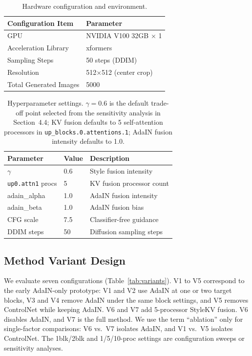 \documentclass[10pt,twocolumn]{article}
\begin{document}
\begin{table}[htbp]
  \centering
  \caption{Hardware configuration and environment.}
  \label{tab:hardware}
  \small
  \begin{tabular}{ll}
    \toprule
    Configuration Item & Parameter \\
    \midrule
    GPU & NVIDIA V100 32GB $\times$ 1 \\
    Acceleration Library & xformers \\
    Sampling Steps & 50 steps (DDIM) \\
    Resolution & 512$\times$512 (center crop) \\
    Total Generated Images & 5000 \\
    \bottomrule
  \end{tabular}
\end{table}

\begin{table}[htbp]
  \centering
  \caption{Hyperparameter settings. $\gamma=0.6$ is the default trade-off point selected from the sensitivity analysis in Section~4.4; KV fusion defaults to 5 self-attention processors in \texttt{up\_blocks.0.attentions.1}; AdaIN fusion intensity defaults to 1.0.}
  \label{tab:hyperparams}
  \small
  \begin{tabular}{lll}
    \toprule
    Parameter & Value & Description \\
    \midrule
    $\gamma$ & 0.6 & Style fusion intensity \\
    \texttt{up0.attn1} procs & 5 & KV fusion processor count \\
    adain\_alpha & 1.0 & AdaIN fusion intensity \\
    adain\_beta  & 1.0 & AdaIN fusion bias \\
    CFG scale & 7.5 & Classifier-free guidance \\
    DDIM steps & 50 & Diffusion sampling steps \\
    \bottomrule
  \end{tabular}
\end{table}

\subsection{Method Variant Design}

We evaluate seven configurations (Table~\ref{tab:variants}). V1 to V5 correspond to the early AdaIN-only prototype: V1 and V2 use AdaIN at one or two target blocks, V3 and V4 remove AdaIN under the same block settings, and V5 removes ControlNet while keeping AdaIN. V6 and V7 add 5-processor StyleKV fusion. V6 disables AdaIN, and V7 is the full method. We use the term ``ablation'' only for single-factor comparisons: V6 vs.\ V7 isolates AdaIN, and V1 vs.\ V5 isolates ControlNet. The 1blk/2blk and 1/5/10-proc settings are configuration sweeps or sensitivity analyses.
\end{document}
